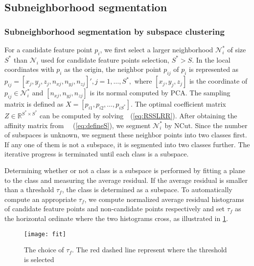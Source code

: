 \subsection{Subneighborhood segmentation}
\label{sec:Subneighborhood_Segmentation}
\subsubsection{Subneighborhood segmentation by subspace clustering}
For a candidate feature point $p_{i}$, we first select a larger neighborhood $\mathcal {N}_{i}^{*}$ of size $S^{*}$ than $\mathcal{N}_{i}$ used for candidate feature points selection, \ie $S^{*}>S$.
In the local coordinates with $p_{i}$ as the origin, the neighbor point $p_{ij}$ of $p_{i}$ is represented as
$p_{ij} = [x_{j}, y_{j}, z_{j}, n_{xj}, n_{yj}, n_{zj}]',j = 1, \ldots, S^{*},$ where
$[x_{j},y_{j},z_{j}]$ is the coordinate of $p_{ij}\in\mathcal{N}_{i}^{*}$ and
$[n_{xj}, n_{yj}, n_{zj}]$ is its normal computed by PCA.
The sampling matrix is defined as $X = [p_{i1}, p_{i2}, \ldots, p_{iS^{*}}]$.
The optimal coefficient matrix $Z\in \mathbb{R}^{S^{*}\times S^{*}}$ can be computed by solving~\eq~(\ref{eq:RSSLRR}).
After obtaining the affinity matrix from ~\eq~(\ref{eq:defineS}), we segment $\mathcal {N}_{i}^{*}$ by NCut. Since the number of subspaces is unknown, we segment these neighbor points into two classes first.
If any one of them is not a subspace, it is segmented into two classes further.
The iterative progress is terminated until each class is a subspace.

Determining whether or not a class is a subspace is performed by fitting a plane to the class and measuring the average residual.
If the average residual is smaller than a threshold $\tau_{f}$, the class is determined as a subspace.
To automatically compute an appropriate $\tau_{f}$, we compute normalized average residual histograms of candidate feature points and non-candidate points respectively and set $\tau_{f}$ as the horizontal ordinate
where the two histograms cross, as illustrated in \fig \ref{fig:fit_threshold}.
\begin{figure}
  \centering
  \texttt{[image: fit]}
  \caption{The choice of $\tau_{f}$. The red dashed line represent where the threshold is selected}\label{fig:fit_threshold}
\end{figure}

